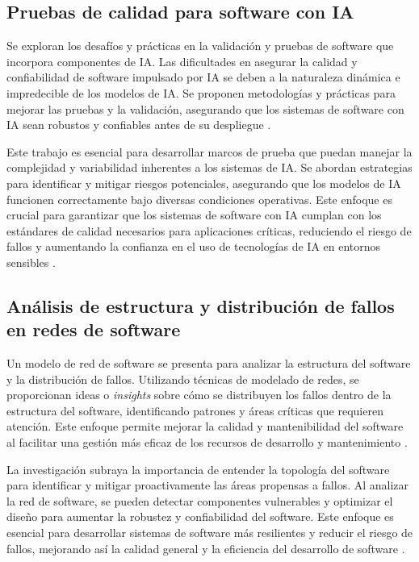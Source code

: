\subsection{Pruebas de calidad para software con IA}

Se exploran los desafíos y prácticas en la validación y pruebas de software que incorpora componentes de IA. Las dificultades en asegurar la calidad y confiabilidad de software impulsado por IA se deben a la naturaleza dinámica e impredecible de los modelos de IA. Se proponen metodologías y prácticas para mejorar las pruebas y la validación, asegurando que los sistemas de software con IA sean robustos y confiables antes de su despliegue \cite{Tao2019}.

Este trabajo es esencial para desarrollar marcos de prueba que puedan manejar la complejidad y variabilidad inherentes a los sistemas de IA. Se abordan estrategias para identificar y mitigar riesgos potenciales, asegurando que los modelos de IA funcionen correctamente bajo diversas condiciones operativas. Este enfoque es crucial para garantizar que los sistemas de software con IA cumplan con los estándares de calidad necesarios para aplicaciones críticas, reduciendo el riesgo de fallos y aumentando la confianza en el uso de tecnologías de IA en entornos sensibles \cite{Tao2019}.

\subsection{Análisis de estructura y distribución de fallos en redes de software}

Un modelo de red de software se presenta para analizar la estructura del software y la distribución de fallos. Utilizando técnicas de modelado de redes, se proporcionan ideas o \textit{insights} sobre cómo se distribuyen los fallos dentro de la estructura del software, identificando patrones y áreas críticas que requieren atención. Este enfoque permite mejorar la calidad y mantenibilidad del software al facilitar una gestión más eficaz de los recursos de desarrollo y mantenimiento \cite{Ai2019}.

La investigación subraya la importancia de entender la topología del software para identificar y mitigar proactivamente las áreas propensas a fallos. Al analizar la red de software, se pueden detectar componentes vulnerables y optimizar el diseño para aumentar la robustez y confiabilidad del software. Este enfoque es esencial para desarrollar sistemas de software más resilientes y reducir el riesgo de fallos, mejorando así la calidad general y la eficiencia del desarrollo de software \cite{Ai2019}.

